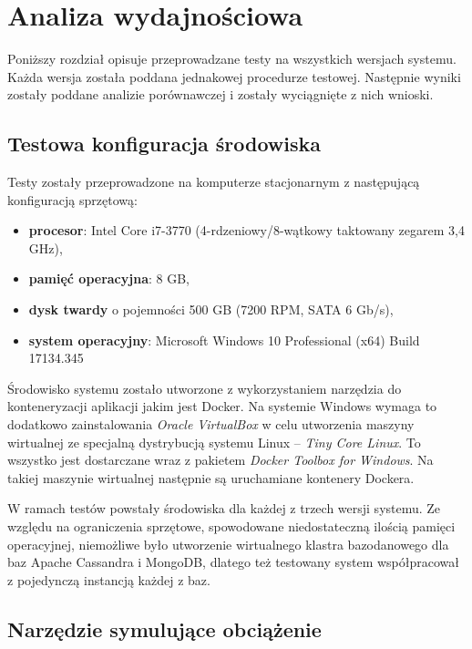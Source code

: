 \chapter{Analiza wydajnościowa}

Poniższy rozdział opisuje przeprowadzane testy na wszystkich wersjach systemu.
Każda wersja została poddana jednakowej procedurze testowej.
Następnie wyniki zostały poddane analizie porównawczej i zostały wyciągnięte z nich wnioski.

\section{Testowa konfiguracja środowiska}

Testy zostały przeprowadzone na komputerze stacjonarnym z następującą konfiguracją sprzętową:
\begin{itemize}
    \item \textbf{procesor}: Intel Core i7-3770 (4-rdzeniowy/8-wątkowy taktowany zegarem 3,4 GHz),
    \item \textbf{pamięć operacyjna}: 8 GB,
    \item \textbf{dysk twardy} o pojemności 500 GB (7200 RPM, SATA 6 Gb/s),
    \item \textbf{system operacyjny}: Microsoft Windows 10 Professional (x64) Build 17134.345
\end{itemize}

Środowisko systemu zostało utworzone z wykorzystaniem narzędzia do konteneryzacji aplikacji jakim jest Docker.
Na systemie Windows wymaga to dodatkowo zainstalowania \textit{Oracle VirtualBox} w celu utworzenia maszyny wirtualnej ze specjalną dystrybucją systemu Linux -- \textit{Tiny Core Linux}.
To wszystko jest dostarczane wraz z pakietem \textit{Docker Toolbox for Windows}.
Na takiej maszynie wirtualnej następnie są uruchamiane kontenery Dockera.

W ramach testów powstały środowiska dla każdej z trzech wersji systemu.
Ze względu na ograniczenia sprzętowe, spowodowane niedostateczną ilością pamięci operacyjnej, niemożliwe było utworzenie wirtualnego klastra bazodanowego dla baz Apache Cassandra i MongoDB, dlatego też testowany system współpracował z pojedynczą instancją każdej z baz.

\section{Narzędzie symulujące obciążenie}

